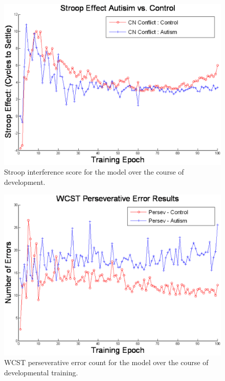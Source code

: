 \begin{figure}[t]
\begin{center}
	\includegraphics[width=145mm]{graphs/stroop_devel.eps}
\end{center}
\caption{Stroop interference score for the model over the course of development.} 
\label{stroop-devel-figure}
\end{figure} 

\begin{figure}[t]
\begin{center}
	\includegraphics[width=145mm]{graphs/wcst_devel_persev.eps}
\end{center}
\caption{WCST perseverative error count for the model over the course of developmental training.} 
\label{wcst-devel-figure}
\end{figure} 

